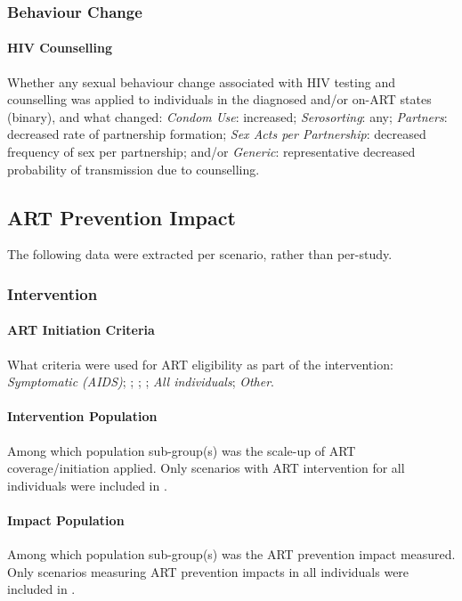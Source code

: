 \subsubsection{Behaviour Change}\label{app.sr.defs.art.bc}
\paragraph{HIV Counselling}
Whether any sexual behaviour change associated with HIV testing and counselling
was applied to individuals in the diagnosed and/or on-ART states (binary),
and what changed:
\emph{Condom Use}: increased;
\emph{Serosorting}: any;
\emph{Partners}: decreased rate of partnership formation;
\emph{Sex Acts per Partnership}: decreased frequency of sex per partnership; and/or
\emph{Generic}: representative decreased probability of transmission due to counselling.
\subsection{ART Prevention Impact}\label{app.sr.defs.api}
The following data were extracted per scenario, rather than per-study.
\subsubsection{Intervention}\label{app.sr.defs.api.interv}
\paragraph{ART Initiation Criteria}
What criteria were used for ART eligibility as part of the intervention:
\emph{Symptomatic (AIDS)};
\emph{};
\emph{};
\emph{};
\emph{All individuals};
\emph{Other}.
\paragraph{Intervention Population}
Among which population sub-group(s) was the scale-up of ART coverage/initiation applied.
Only scenarios with ART intervention for all individuals were included in .
\paragraph{Impact Population}
Among which population sub-group(s) was the ART prevention impact measured.
Only scenarios measuring ART prevention impacts in all individuals were included in .

